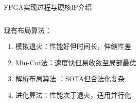 \documentclass[10pt]{beamer}
\begin{document}
\begin{frame}{FPGA实现过程与硬核IP介绍}
\begin{columns}[T, onlytextwidth]
  \end{columns}

  \vspace{-0.6cm}

    现有布局算法：  
        \begin{enumerate}
          \item 模拟退火：性能好但时间长，伸缩性差
          \item Min-Cut法：速度快但易收敛至局部最优
          \item 解析布局算法 ：SOTA但合法化复杂
          \item 进化算法：性能次于退火，适用并行化
        \end{enumerate}    

\end{frame}
\end{document}
